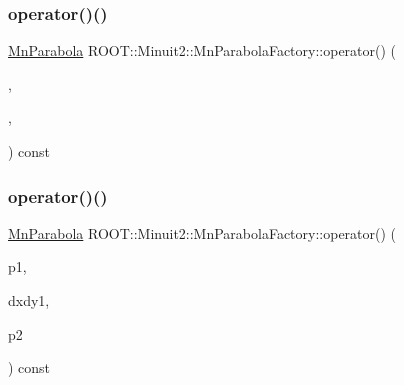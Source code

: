 \subsubsection{\texorpdfstring{operator()()}{operator()()}\hspace{0.1cm}{\footnotesize\ttfamily [4/6]}}
{\footnotesize\ttfamily \mbox{\hyperlink{classROOT_1_1Minuit2_1_1MnParabola}{Mn\+Parabola}} R\+O\+O\+T\+::\+Minuit2\+::\+Mn\+Parabola\+Factory\+::operator() (\begin{DoxyParamCaption}\item[{const \mbox{\hyperlink{classROOT_1_1Minuit2_1_1MnParabolaPoint}{Mn\+Parabola\+Point}} \&}]{,  }\item[{double}]{,  }\item[{const \mbox{\hyperlink{classROOT_1_1Minuit2_1_1MnParabolaPoint}{Mn\+Parabola\+Point}} \&}]{ }\end{DoxyParamCaption}) const}

\mbox{\label{classROOT_1_1Minuit2_1_1MnParabolaFactory_ab4b6a74b071f4d780dbf6b4663c188b3}} 
\subsubsection{\texorpdfstring{operator()()}{operator()()}\hspace{0.1cm}{\footnotesize\ttfamily [5/6]}}
{\footnotesize\ttfamily \mbox{\hyperlink{classROOT_1_1Minuit2_1_1MnParabola}{Mn\+Parabola}} R\+O\+O\+T\+::\+Minuit2\+::\+Mn\+Parabola\+Factory\+::operator() (\begin{DoxyParamCaption}\item[{const \mbox{\hyperlink{classROOT_1_1Minuit2_1_1MnParabolaPoint}{Mn\+Parabola\+Point}} \&}]{p1,  }\item[{double}]{dxdy1,  }\item[{const \mbox{\hyperlink{classROOT_1_1Minuit2_1_1MnParabolaPoint}{Mn\+Parabola\+Point}} \&}]{p2 }\end{DoxyParamCaption}) const}

